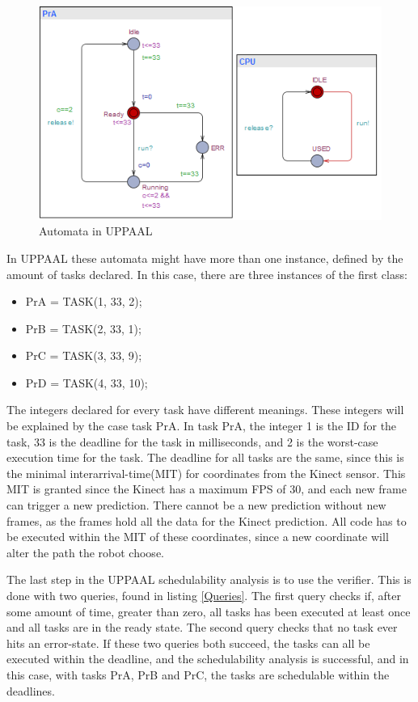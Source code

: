 \begin{figure}[h]
	\centering
	\includegraphics[scale=1]{billeder/UPPAALPr}
	\caption{Automata in UPPAAL}
	\label{UPPAAL Automata}
\end{figure}


In UPPAAL these automata might have more than one instance, defined by the amount of tasks declared. In this case, there are three instances of the first class:


\begin{itemize}
	\item PrA = TASK(1, 33, 2);
	\item PrB = TASK(2, 33, 1);
	\item PrC = TASK(3, 33, 9);
	\item PrD = TASK(4, 33, 10);
\end{itemize}


The integers declared for every task have different meanings. These integers will be explained by the case task PrA. In task PrA, the integer 1 is the ID for the task, 33 is the deadline for the task in milliseconds, and 2 is the worst-case execution time for the task. The deadline for all tasks are the same, since this is the minimal interarrival-time(MIT) for coordinates from the Kinect sensor. This MIT is granted since the Kinect has a maximum FPS of 30, and each new frame can trigger a new prediction. There cannot be a new prediction without new frames, as the frames hold all the data for the Kinect prediction.
All code has to be executed within the MIT of these coordinates, since a new coordinate will alter the path the robot choose. 


The last step in the UPPAAL schedulability analysis is to use the verifier. This is done with two queries, found in listing \ref{Queries}. The first query checks if, after some amount of time, greater than zero, all tasks has been executed at least once and all tasks are in the ready state. The second query checks that no task ever hits an error-state. If these two queries both succeed, the tasks can all be executed within the deadline, and the schedulability analysis is successful, and in this case, with tasks PrA, PrB and PrC, the tasks are schedulable within the deadlines.


